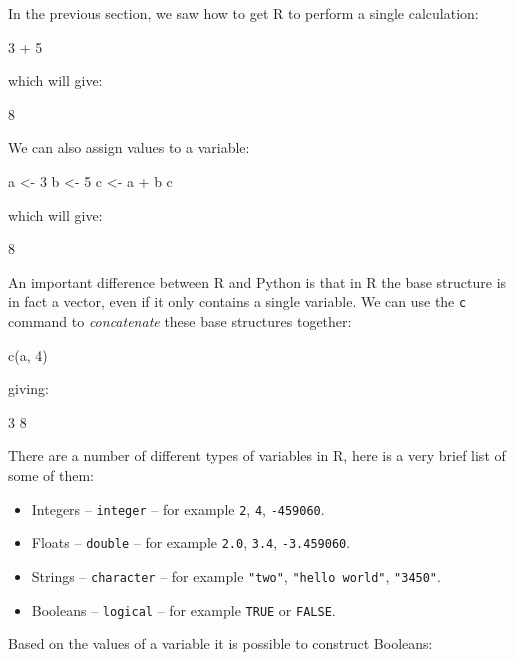 In the previous section, we saw how to get R to perform a single
calculation:

\begin{Rin}
3 + 5
\end{Rin}

which will give:

\begin{Rout}
8
\end{Rout}

We can also assign values to a variable:

\begin{Rin}
a <- 3
b <- 5
c <- a + b
c
\end{Rin}

which will give:

\begin{Rout}
8
\end{Rout}

An important difference between R and Python is that in R the base structure is
in fact a vector, even if it only contains a single variable. We can use the
\texttt{c} command to \textit{concatenate} these base structures
together:

\begin{Rin}
c(a, 4)
\end{Rin}

giving:

\begin{Rout}
3 8
\end{Rout}

There are a number of different types of variables in R, here is a very
brief list of some of them:

\begin{itemize}
    \item Integers -- \texttt{integer} -- for example \texttt{2},
        \texttt{4}, \texttt{-459060}.
    \item Floats -- \texttt{double} -- for example \texttt{2.0},
        \texttt{3.4}, \texttt{-3.459060}.
    \item Strings -- \texttt{character} -- for example
        \texttt{"two"}, \texttt{"hello world"}, \texttt{"3450"}.
    \item Booleans -- \texttt{logical} -- for example
        \texttt{TRUE} or
        \texttt{FALSE}.
\end{itemize}

Based on the values of a variable it is possible to construct Booleans:

